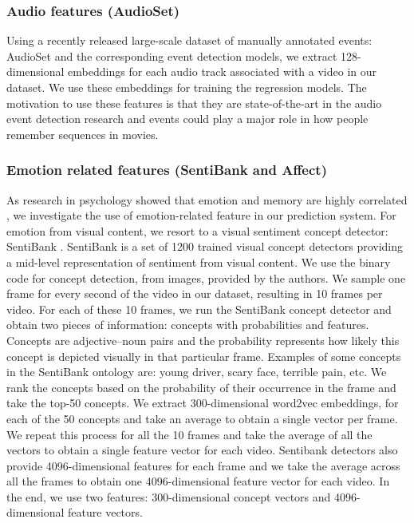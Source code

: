 \documentclass[sigconf]{acmart}
\begin{document}
\subsubsection{Audio features (AudioSet)}
\label{as-feat}
Using a recently released large-scale dataset of manually annotated events: AudioSet \cite{audioset-feat} and the corresponding event detection models, we extract 128-dimensional embeddings for each audio track associated with a video in our dataset.
We use these embeddings for training the regression models.
The motivation to use these features is that they are state-of-the-art in the audio event detection research and events could play a major role in how people remember sequences in movies.

\subsubsection{Emotion related features (SentiBank and Affect)}
\label{emo-feat}
As research in psychology showed that emotion and memory are highly correlated \cite{emo-mem}, we investigate the use of emotion-related feature in our prediction system.
For emotion from visual content, we resort to a visual sentiment concept detector: SentiBank \cite{sb-feat}.
SentiBank is a set of 1200 trained visual concept detectors providing a mid-level representation of sentiment from visual content.
We use the binary code for concept detection, from images, provided by the authors.
We sample one frame for every second of the video in our dataset, resulting in 10 frames per video.
For each of these 10 frames, we run the SentiBank concept detector and obtain two pieces of information: concepts with probabilities and features.
Concepts are adjective--noun pairs and the probability represents how likely this concept is depicted visually in that particular frame.
Examples of some concepts in the SentiBank ontology are: young driver, scary face, terrible pain, etc.
We rank the concepts based on the probability of their occurrence in the frame and take the top-50 concepts.
We extract 300-dimensional word2vec \cite{word2vec} embeddings, for each of the 50 concepts and take an average to obtain a single vector per frame.
We repeat this process for all the 10 frames and take the average of all the vectors to obtain a single feature vector for each video.
Sentibank detectors also provide 4096-dimensional features for each frame and we take the average across all the frames to obtain one 4096-dimensional feature vector for each video.
In the end, we use two features: 300-dimensional concept vectors and 4096-dimensional feature vectors.
\end{document}
